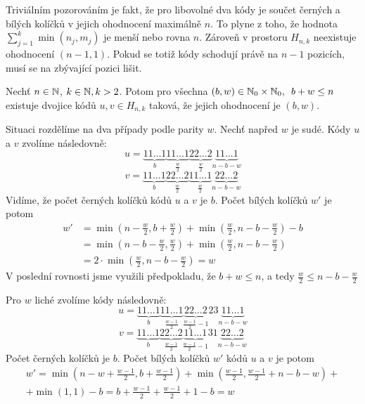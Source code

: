 Triviálním pozorováním je fakt, že pro libovolné dva kódy je součet černých a bílých kolíčků v jejich ohodnocení maximálně $n$. To plyne z toho, že hodnota $\sum_{j = 1}^k  \min(n_j, m_j)$ je menší nebo rovna $n$. Zároveň v prostoru $H_{n,k}$ neexistuje ohodnocení $(n-1,1)$. Pokud se totiž kódy schodují právě na $n-1$ pozicích, musí se na zbývající pozici lišit. 
\begin{tvrz}\label{tvrzohodnoceni}
    Nechť $n \in \mathbb{N}$, $k \in \mathbb{N}, k>2$. Potom pro všechna $(b,w)\in \mathbb{N}_0 \times \mathbb{N}_0,\hspace{5px} b + w \leq n$ existuje dvojice kódů $u,v \in H_{n,k}$ taková, že jejich ohodnocení je $(b,w)$.
\end{tvrz}
\begin{dukaz}

    
    
    Situaci rozdělíme na dva případy podle parity $w$. Nechť napřed $w$ je sudé. Kódy $u$ a $v$ zvolíme následovně:
\[
  u = 
    \underbrace{11\dots1}_{b}
    \underbrace{11\dots1}_{\frac{w}{2}}
    \underbrace{22\dots2}_{\frac{w}{2}}
    \underbrace{11\dots1}_{n-b-w}
 \]
 \[
  v = 
    \underbrace{11\dots1}_{b}
    \underbrace{22\dots2}_{\frac{w}{2}}
    \underbrace{11\dots1}_{\frac{w}{2}}
    \underbrace{22\dots2}_{n-b-w}
 \]
Vidíme, že počet černých kolíčků kódů $u$ a $v$ je $b$. Počet bílých kolíčků $w'$ je potom
\begin{align*} 
w' &= \min\left(n - \frac{w}{2}, b + \frac{w}{2}\right) + \min\left(\frac{w}{2}, n - b - \frac{w}{2}\right) - b \\ 
&= \min\left(n - b - \frac{w}{2}, \frac{w}{2}\right) + \min\left(\frac{w}{2}, n - b - \frac{w}{2}\right) \\
&= 2\cdot\min\left(\frac{w}{2}, n - b - \frac{w}{2}\right) = w
\end{align*}
V poslední rovnosti jsme využili předpokladu, že $b+w \leq n$, a tedy $\frac{w}{2} \leq n - b - \frac{w}{2}$

Pro $w$ liché zvolíme kódy následovně:
\[
  u = 
    \underbrace{11\dots1}_{b}
    \underbrace{11\dots1}_{\frac{w-1}{2}}
    \underbrace{22\dots2}_{\frac{w-1}{2}-1}
    2
    3
    \underbrace{11\dots1}_{n-b-w}
 \]
 \[
  v = 
    \underbrace{11\dots1}_{b}
    \underbrace{22\dots2}_{\frac{w-1}{2}}
    \underbrace{11\dots1}_{\frac{w-1}{2}-1}
    3
    1
    \underbrace{22\dots2}_{n-b-w}
 \]
Počet černých kolíčků je $b$. Počet bílých kolíčků $w'$ kódů $u$ a $v$ je potom
\begin{align*} 
w' = \min\left(n-w+\frac{w-1}{2}, b + \frac{w-1}{2}\right) + \min\left(\frac{w-1}{2}, \frac{w-1}{2} + n-b-w\right) + \\ +\min(1,1) - b 
 = b + \frac{w-1}{2} + \frac{w-1}{2} + 1 - b = w
\end{align*}
\end{dukaz}

